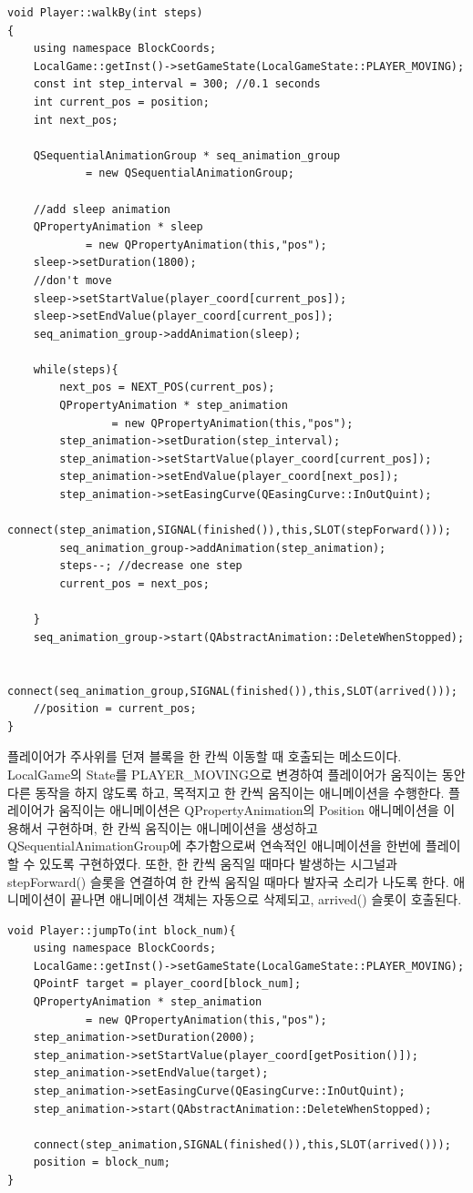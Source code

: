 \documentclass[10pt,oneside,a4paper,titlepage]{article}
\begin{document}
\begin{lstlisting}
void Player::walkBy(int steps)
{
    using namespace BlockCoords;
    LocalGame::getInst()->setGameState(LocalGameState::PLAYER_MOVING);
    const int step_interval = 300; //0.1 seconds
    int current_pos = position;
    int next_pos;

    QSequentialAnimationGroup * seq_animation_group
            = new QSequentialAnimationGroup;

    //add sleep animation
    QPropertyAnimation * sleep
            = new QPropertyAnimation(this,"pos");
    sleep->setDuration(1800);
    //don't move
    sleep->setStartValue(player_coord[current_pos]);
    sleep->setEndValue(player_coord[current_pos]);
    seq_animation_group->addAnimation(sleep);

    while(steps){
        next_pos = NEXT_POS(current_pos);
        QPropertyAnimation * step_animation
                = new QPropertyAnimation(this,"pos");        
        step_animation->setDuration(step_interval);
        step_animation->setStartValue(player_coord[current_pos]);
        step_animation->setEndValue(player_coord[next_pos]);
        step_animation->setEasingCurve(QEasingCurve::InOutQuint);
        connect(step_animation,SIGNAL(finished()),this,SLOT(stepForward()));
        seq_animation_group->addAnimation(step_animation);
        steps--; //decrease one step
        current_pos = next_pos;

    }
    seq_animation_group->start(QAbstractAnimation::DeleteWhenStopped);

    connect(seq_animation_group,SIGNAL(finished()),this,SLOT(arrived()));
    //position = current_pos;
}
\end{lstlisting}

플레이어가 주사위를 던져 블록을 한 칸씩 이동할 때 호출되는 메소드이다. LocalGame의 State를 PLAYER\_MOVING으로 변경하여 플레이어가 움직이는 동안 다른 동작을 하지 않도록 하고, 목적지고 한 칸씩 움직이는 애니메이션을 수행한다. 플레이어가 움직이는 애니메이션은 QPropertyAnimation의 Position 애니메이션을 이용해서 구현하며, 한 칸씩 움직이는 애니메이션을 생성하고 QSequentialAnimationGroup에 추가함으로써 연속적인 애니메이션을 한번에 플레이할 수 있도록 구현하였다. 또한, 한 칸씩 움직일 때마다 발생하는 시그널과 stepForward() 슬롯을 연결하여 한 칸씩 움직일 때마다 발자국 소리가 나도록 한다. 애니메이션이 끝나면 애니메이션 객체는 자동으로 삭제되고, arrived() 슬롯이 호출된다.\\

\begin{lstlisting}
void Player::jumpTo(int block_num){
    using namespace BlockCoords;
    LocalGame::getInst()->setGameState(LocalGameState::PLAYER_MOVING);
    QPointF target = player_coord[block_num];
    QPropertyAnimation * step_animation
            = new QPropertyAnimation(this,"pos");
    step_animation->setDuration(2000);
    step_animation->setStartValue(player_coord[getPosition()]);
    step_animation->setEndValue(target);
    step_animation->setEasingCurve(QEasingCurve::InOutQuint);
    step_animation->start(QAbstractAnimation::DeleteWhenStopped);

    connect(step_animation,SIGNAL(finished()),this,SLOT(arrived()));
    position = block_num;
}
\end{lstlisting}
\end{document}
